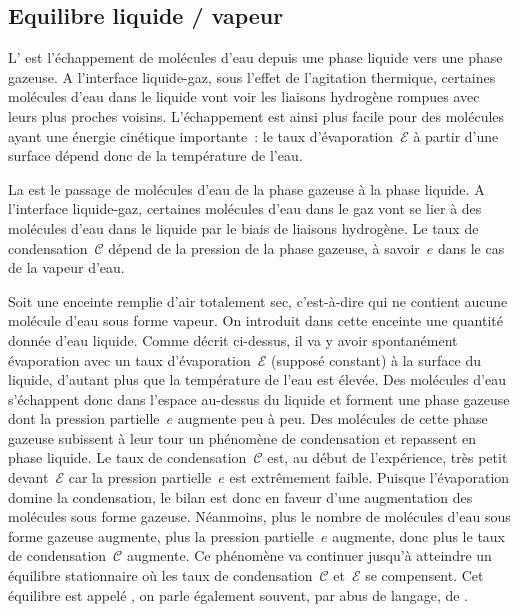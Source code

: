 \sk
\subsection{Equilibre liquide / vapeur}

\sk
L' est l'échappement de molécules d'eau depuis une phase liquide vers une phase gazeuse. A l'interface liquide-gaz, sous l'effet de l'agitation thermique, certaines molécules d'eau dans le liquide vont voir les liaisons hydrogène rompues avec leurs plus proches voisins. L'échappement est ainsi plus facile pour des molécules ayant une énergie cinétique importante~: le taux d'évaporation~$\mathcal{E}$ à partir d'une surface dépend donc de la température de l'eau. 

\sk
La  est le passage de molécules d'eau de la phase gazeuse à la phase liquide. A l'interface liquide-gaz, certaines molécules d'eau dans le gaz vont se lier à des molécules d'eau dans le liquide par le biais de liaisons hydrogène. Le taux de condensation~$\mathcal{C}$ dépend de la pression de la phase gazeuse, à savoir~$e$ dans le cas de la vapeur d'eau. 

\sk
Soit une enceinte remplie d'air totalement sec, c'est-à-dire qui ne contient aucune molécule d'eau sous forme vapeur. On introduit dans cette enceinte une quantité donnée d'eau liquide. Comme décrit ci-dessus, il va y avoir spontanément évaporation avec un taux d'évaporation~$\mathcal{E}$ (supposé constant) à la surface du liquide, d'autant plus que la température de l'eau est élevée. Des molécules d'eau s'échappent donc dans l'espace au-dessus du liquide et forment une phase gazeuse dont la pression partielle~$e$ augmente peu à peu. Des molécules de cette phase gazeuse subissent à leur tour un phénomène de condensation et repassent en phase liquide. Le taux de condensation~$\mathcal{C}$ est, au début de l'expérience, très petit devant~$\mathcal{E}$ car la pression partielle~$e$ est extrêmement faible. Puisque l'évaporation domine la condensation, le bilan est donc en faveur d'une augmentation des molécules sous forme gazeuse. Néanmoins, plus le nombre de molécules d'eau sous forme gazeuse augmente, plus la pression partielle~$e$ augmente, donc plus le taux de condensation~$\mathcal{C}$ augmente. Ce phénomène va continuer jusqu'à atteindre un équilibre stationnaire où les taux de condensation~$\mathcal{C}$ et~$\mathcal{E}$ se compensent. Cet équilibre est appelé , on parle également souvent, par abus de langage, de .%

